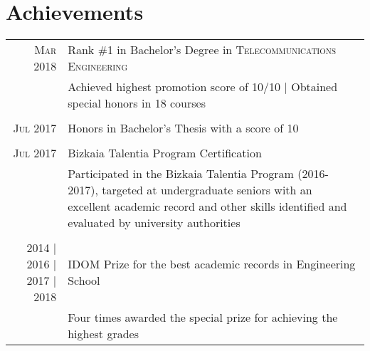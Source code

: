 \documentclass[a4paper,10pt]{article}
\begin{document}
\section{Achievements}
\begin{tabular}{rp{13.6cm}}
\textsc{Mar} 2018 & Rank \#1 in Bachelor's Degree in \textsc{Telecommunications Engineering} \\%
&\footnotesize{Achieved highest promotion score of 10/10 | Obtained special honors in 18 courses} \\\vspace{-0.05in}&\\

\textsc{Jul} 2017 & Honors in Bachelor's Thesis with a score of 10 \\%
\vspace{-0.05in}&\\

\textsc{Jul} 2017 & Bizkaia Talentia Program Certification \\%
& \footnotesize{Participated in the Bizkaia Talentia Program (2016-2017), targeted at undergraduate seniors \newline with an excellent academic record and other skills identified and evaluated by university authorities} \\\vspace{-0.05in}&\\

2014 | 2016 | 2017 | 2018 & IDOM Prize for the best academic records in Engineering School\\%
&\footnotesize{ Four times awarded the special prize for achieving the highest grades} \\
\end{tabular}
\end{document}

